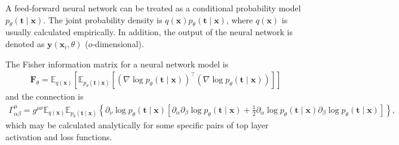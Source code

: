 \documentclass{amsart}
\theoremstyle{definition}
\theoremstyle{remark}
\numberwithin{equation}{section}
\newcommand{\mbf}[1]{\mathbf{#1}}
\newcommand{\mbb}[1]{\mathbb{#1}}
\begin{document}
A feed-forward neural network can be treated as a conditional probability model $p_\theta(\mbf{t}\mid\mbf{x})$. The joint probability density is $q(\mbf{x})p_\theta(\mbf{t}\mid\mbf{x})$, where $q(\mbf{x})$ is usually calculated empirically. In addition, the output of the neural network is denoted as $\mbf{y}(\mbf{x}_i,\theta)$ ($o$-dimensional). 

The Fisher information matrix for a neural network model is
\begin{align*}
\mbf{F}_\theta = \mbb{E}_{q(\mbf{x})} [\mbb{E}_{p_\theta(\mbf{t}\mid\mbf{x})}[(\nabla \log p_\theta(\mbf{t}\mid\mbf{x}))^\intercal(\nabla\log p_\theta(\mbf{t}\mid\mbf{x}))]]
\end{align*}
and the connection is
\begin{align*}
\Gamma_{\alpha\beta}^\mu = g^{\mu\nu} \mbb{E}_{q(\mbf{x})}\mbb{E}_{p_{\theta}(\mbf{t}\mid\mbf{x})}\left\{\partial_\nu\log p_\theta(\mbf{t}\mid\mbf{x})\left[\partial_\alpha\partial_\beta\log p_\theta(\mbf{t}\mid\mbf{x}) + \frac{1}{2}\partial_\alpha \log p_\theta(\mbf{t}\mid\mbf{x}) \partial_\beta \log p_\theta(\mbf{t}\mid\mbf{x})\right]\right\},
\end{align*}
which may be calculated analytically for some specific pairs of top layer activation and loss functions.
\end{document}
